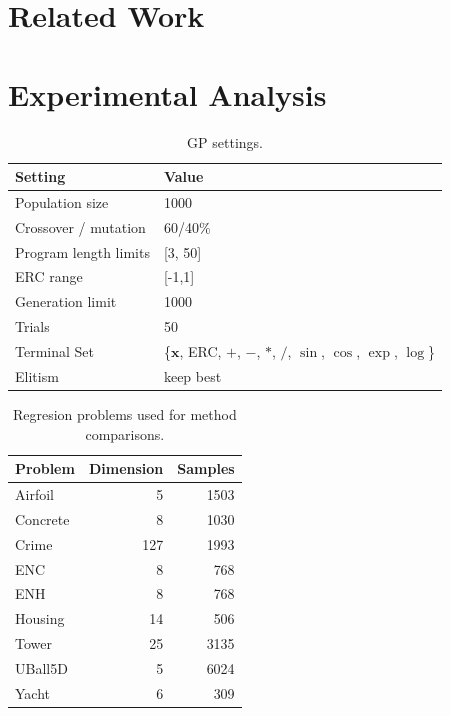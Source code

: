\documentclass[preprint]{article}
\begin{document}
\section{Related Work}\label{s:3}


\section{Experimental Analysis} \label{s:4}

\begin{table}
\scriptsize
\caption{GP settings.}\label{tbl:symreg_settings}
\begin{tabularx}{\columnwidth}{X R{0.57\columnwidth}} \toprule
Setting& Value \\ \midrule
Population size & 1000 \\
Crossover / mutation & 60/40\% \\
Program length limits & [3, 50] \\ 
ERC range & [-1,1] \\
Generation limit & 1000 \\
Trials & 50 \\
Terminal Set & \{$\mathbf{x}$, ERC, $+$, $-$, $*$, $/$, $\sin$, $\cos$, $\exp$, $\log$\}\\
Elitism & keep best \\
\end{tabularx}
\end{table}
\begin{table}
\scriptsize
\caption{Regresion problems used for method comparisons.}\label{tbl:regression}
\begin{tabularx}{\columnwidth}{X r r } \toprule
Problem & Dimension & Samples \\ \midrule
Airfoil & 5	& 1503 \\
Concrete	& 	8	& 1030	\\
Crime	&	127	&	1993	\\
ENC & 8 & 768 \\
ENH & 8 & 768 \\
Housing & 14 & 506 \\
Tower & 25 & 3135 \\
UBall5D & 5 & 6024 \\ 
Yacht	& 6	&	309	\\ \midrule
\end{tabularx}
\end{table}
\end{document}
